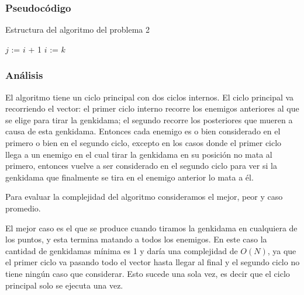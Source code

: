 \newpage
\subsubsection{Pseudocódigo}
\begin{algorithm}[h]
\caption{Estructura del algoritmo del problema 2}
\begin{algorithmic}[1]
		$j$ := $i$ + 1
		\EndWhile
		\EndWhile
		$i$ := $k$
	\EndFor
	\EndFor
	\EndFunction
\end{algorithmic}
\end{algorithm}


\subsubsection{Análisis}
El algoritmo tiene un ciclo principal con dos ciclos internos. El ciclo principal va recorriendo el vector: el primer ciclo interno recorre los enemigos anteriores al que se elige para tirar la genkidama; el segundo recorre los posteriores que mueren a causa de esta genkidama. Entonces cada enemigo es o bien considerado en el primero o bien en el segundo ciclo, excepto en los casos donde el primer ciclo llega a un enemigo en el cual tirar la genkidama en su posición no mata al primero, entonces vuelve a ser considerado en el segundo ciclo para ver si la genkidama que finalmente se tira en el enemigo anterior lo mata a él.

Para evaluar la complejidad del algoritmo consideramos el mejor, peor y caso promedio.

El mejor caso es el que se produce cuando tiramos la genkidama en cualquiera de los puntos, y esta termina matando a todos los enemigos. En este caso la cantidad de genkidamas mínima es 1 y daría una complejidad de $O(N)$, ya que el primer ciclo va pasando todo el vector hasta llegar al final y el segundo ciclo no tiene ningún caso que considerar. Esto sucede una sola vez, es decir que el ciclo principal solo se ejecuta una vez.

